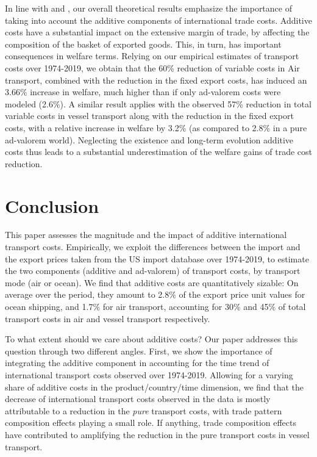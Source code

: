 \documentclass[a4paper,11pt]{article}
\begin{document}
In line with \cite{sorensen2014} and \cite{Irrazabal_2015}, our overall theoretical results emphasize the importance of taking into account the additive components of international trade costs. Additive costs have a substantial impact on the extensive margin of trade, by affecting the composition of the basket of exported goods. This, in turn, has important consequences in welfare terms. Relying on our empirical estimates of transport costs over 1974-2019, we obtain that the 60\% reduction of variable costs in Air transport, combined with the reduction in the fixed export costs, has induced an 3.66\% increase in welfare, much higher than if only ad-valorem costs were modeled (2.6\%). A similar result applies with the observed 57\% reduction in total variable costs in vessel transport along with the reduction in the fixed export costs, with a relative increase in welfare by 3.2\% (as compared to 2.8\% in a pure ad-valorem world). Neglecting the existence and long-term evolution additive costs thus leads to a substantial underestimation of the welfare gains of trade cost reduction.


\section{Conclusion \label{sec:conclu}}

This paper assesses the magnitude and the impact of additive international transport costs. Empirically, we exploit the differences between the import and the export prices taken from the US import database over 1974-2019, to estimate the two components (additive and ad-valorem) of transport costs, by transport mode (air or ocean). We find that additive costs are quantitatively sizable: On average over the period, they amount to 2.8\% of the export price unit values for ocean shipping, and 1.7\% for air transport, accounting for 30\% and 45\% of total transport costs in air and vessel transport respectively.

To what extent should we care about additive costs? Our paper addresses this question through two different angles. First, we show the importance of integrating the additive component in accounting for the time trend of international transport costs observed over 1974-2019. Allowing for a varying share of additive costs in the product/country/time dimension, we find that the decrease of international transport costs observed in the data is mostly attributable to a reduction in the \textit{pure} transport costs, with trade pattern composition effects playing a small role. If anything, trade composition effects have contributed to amplifying the reduction in the pure transport costs in vessel transport.
\end{document}
